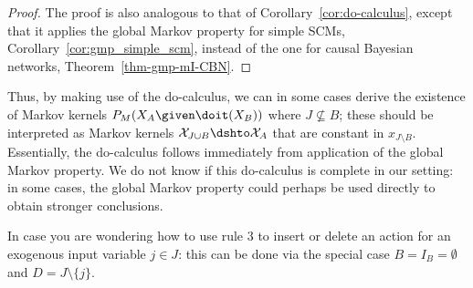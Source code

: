 \begin{proof}
  The proof is also analogous to that of Corollary~\ref{cor:do-calculus}, except that it applies the global
  Markov property for simple SCMs, Corollary~\ref{cor:gmp_simple_scm}, instead of the one for causal Bayesian networks,
  Theorem~\ref{thm-gmp-mI-CBN}. 

\end{proof}

Thus, by making use of the do-calculus, 
we can in some cases derive the existence of Markov kernels $P_{M}(X_A \given \doit(X_B))$
where $J \not\subseteq B$;
these should be interpreted as Markov kernels $\CX_{J \cup B} \dshto \CX_{A}$ that are constant in 
$x_{J\setminus B}$. Essentially, the do-calculus follows immediately from application of the global Markov property. 
We do not know if this do-calculus is complete in our setting: in some cases, the global Markov property could perhaps
be used directly to obtain stronger conclusions.

\begin{Rem}
  In case you are wondering how to use rule 3 to insert or delete an action for an exogenous input
  variable $j \in J$: this can be done via the special case $B = I_B = \emptyset$ and $D = J \setminus \{j\}$.
\end{Rem}


